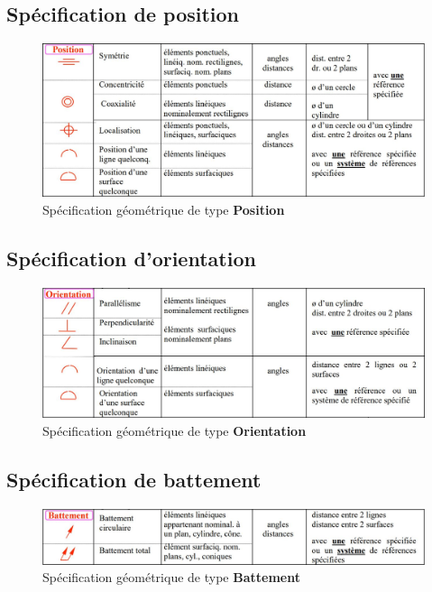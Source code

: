 \documentclass[
	11pt, %
	fleqn, %
	a4paper, %
]{LegrandOrangeBook}
\begin{document}
\subsection{Spécification de position}
\begin{figure}[H] %
	\centering %
	\includegraphics[width=1.15\textwidth]{Images/pos.JPG} 
	\caption{Spécification géométrique de type \textbf{Position}}
	\label{pos} %
\end{figure}

\subsection{Spécification d'orientation}
\begin{figure}[H] %
	\centering %
	\includegraphics[width=1.15\textwidth]{Images/ori.JPG} 
	\caption{Spécification géométrique de type \textbf{Orientation}}
	\label{ori} %
\end{figure}
\subsection{Spécification de battement}
\begin{figure}[H] %
	\centering %
	\includegraphics[width=1.15\textwidth]{Images/bat.JPG} 
	\caption{Spécification géométrique de type \textbf{Battement}}
	\label{bat} %
\end{figure}
\end{document}
